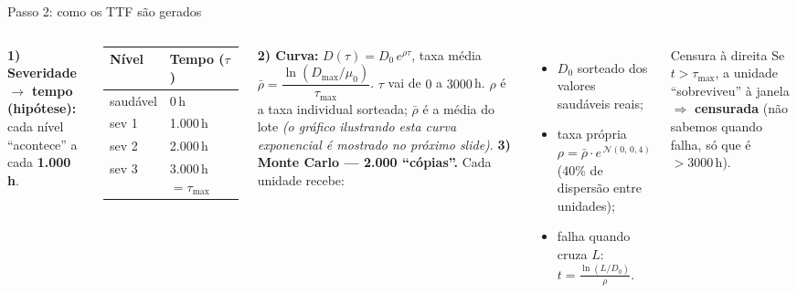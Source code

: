 \documentclass{beamer}
\begin{document}
\begin{frame}{Passo 2: como os TTF são gerados}
    \begin{columns}
        \footnotesize
        \textbf{1) Severidade $\rightarrow$ tempo (hipótese):} cada nível ``acontece'' a cada \textbf{1.000\,h}.
        \vspace{0.1cm}

        \begin{tabular}{ll}
            \toprule
            \textbf{Nível} & \textbf{Tempo ($\tau$)} \\
            \midrule
            saudável & 0\,h \\
            sev 1 & 1.000\,h \\
            sev 2 & 2.000\,h \\
            sev 3 & 3.000\,h $=\tau_{\max}$ \\
            \bottomrule
        \end{tabular}
        \vspace{0.1cm}

        \textbf{2) Curva:} $D(\tau)=D_0\,e^{\rho\tau}$, taxa média $\bar\rho = \dfrac{\ln(D_{\max}/\mu_0)}{\tau_{\max}}$. $\tau$ vai de $0$ a $3000$\,h. $\rho$ é a taxa individual sorteada; $\bar\rho$ é a média do lote \textit{(o gráfico ilustrando esta curva exponencial é mostrado no próximo slide)}.
        \footnotesize
        \textbf{3) Monte Carlo --- 2.000 ``cópias''.} Cada unidade recebe:
        \begin{itemize}
            \item $D_0$ sorteado dos valores saudáveis reais;
            \item taxa própria $\rho = \bar\rho \cdot e^{\,\mathcal{N}(0,\,0{,}4)}$ (40\% de dispersão entre unidades);
            \item falha quando cruza $L$: $\displaystyle t = \frac{\ln(L/D_0)}{\rho}$.
        \end{itemize}
        \begin{block}{Censura à direita}
            \footnotesize Se $t > \tau_{\max}$, a unidade ``sobreviveu'' à janela $\Rightarrow$ \textbf{censurada} (não sabemos quando falha, só que é $> 3000$\,h).
        \end{block}
    \end{columns}
\end{frame}
\end{document}
